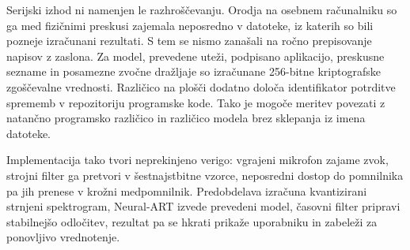 Serijski izhod ni namenjen le razhroščevanju. Orodja na osebnem računalniku so
ga med fizičnimi preskusi zajemala neposredno v datoteke, iz katerih so bili
pozneje izračunani rezultati. S tem se nismo zanašali na ročno prepisovanje
napisov z zaslona. Za model, prevedene uteži, podpisano aplikacijo, preskusne
sezname in posamezne zvočne dražljaje so izračunane 256-bitne kriptografske
zgoščevalne vrednosti. Različico na plošči dodatno določa identifikator
potrditve sprememb v repozitoriju programske kode. Tako je mogoče meritev
povezati z natančno programsko različico in različico modela brez sklepanja iz
imena datoteke.

Implementacija tako tvori neprekinjeno verigo: vgrajeni mikrofon zajame zvok,
strojni filter ga pretvori v šestnajstbitne vzorce, neposredni dostop do
pomnilnika pa jih prenese v krožni medpomnilnik. Predobdelava izračuna
kvantizirani strnjeni spektrogram, Neural-ART izvede prevedeni model,
časovni filter pripravi stabilnejšo odločitev, rezultat pa se hkrati prikaže
uporabniku in zabeleži za ponovljivo vrednotenje.
